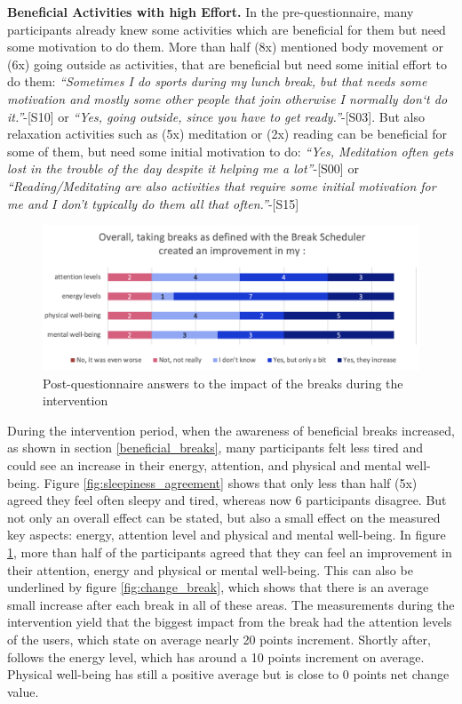 \documentclass{hasel_thesis}
\begin{document}
\textbf{Beneficial Activities with high Effort.} In the pre-questionnaire, many participants already knew some activities which are beneficial for them but need some motivation to do them. More than half (8x) mentioned body movement or (6x) going outside as activities, that are beneficial but need some initial effort to do them: \textit{“Sometimes I do sports during my lunch break, but that needs some motivation and mostly some other people that join otherwise I normally don‘t do it.”}-[S10] or \textit{“Yes, going outside, since you have to get ready.”}-[S03]. But also relaxation activities such as (5x) meditation or (2x) reading can be beneficial for some of them, but need some initial motivation to do: \textit{“Yes, Meditation often gets lost in the trouble of the day despite it helping me a lot”}-[S00] or \textit{“Reading/Meditating are also activities that require some initial motivation for me and I don't typically do them all that often.”}-[S15]

\begin{figure}[htp]
    \centering
    \includegraphics[width=13cm]{hasel_thesis/images/agreement_2_v2.png}
    \caption{Post-questionnaire answers to the impact of the breaks during the intervention}
    \label{fig:impact_breaks_agreement}
\end{figure}

During the intervention period, when the awareness of beneficial breaks increased, as shown in section \ref{beneficial_breaks}, many participants felt less tired and could see an increase in their energy, attention, and physical and mental well-being. Figure \ref{fig:sleepiness_agreement} shows that only less than half (5x) agreed they feel often sleepy and tired, whereas now 6 participants disagree. But not only an overall effect can be stated, but also a small effect on the measured key aspects: energy, attention level and physical and mental well-being. In figure \ref{fig:impact_breaks_agreement}, more than half of the participants agreed that they can feel an improvement in their attention, energy and physical or mental well-being. This can also be underlined by  figure \ref{fig:change_break}, which shows that there is an average small increase after each break in all of these areas. The measurements during the intervention yield that the biggest impact from the break had the attention levels of the users, which state on average nearly 20 points increment. Shortly after, follows the energy level, which has around a 10 points increment on average. Physical well-being has still a positive average but is close to 0 points net change value. 
\end{document}
